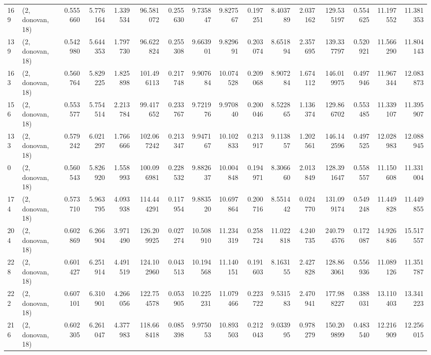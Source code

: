 \begin{tabular}{llrrrrrrrrrrrrrr}
169 &  (2, donovan, 18) &   0.555660 &   5.776164 &   1.339534 &    96.581072 &   0.255630 &   9.735847 &   9.827567 &  0.197251 &   8.403789 &   2.037162 &   129.535197 &  0.554625 &  11.197552 &  11.381353 \\
139 &  (2, donovan, 18) &   0.542980 &   5.644353 &   1.797730 &    96.622824 &   0.255308 &   9.663901 &   9.829691 &  0.203074 &   8.651894 &   2.357695 &   139.337797 &  0.520921 &  11.566290 &  11.804143 \\
163 &  (2, donovan, 18) &   0.560764 &   5.829225 &   1.825898 &   101.496113 &   0.217748 &   9.907684 &  10.074528 &  0.209068 &   8.907284 &   1.674112 &   146.019975 &  0.497946 &  11.967344 &  12.083873 \\
156 &  (2, donovan, 18) &   0.553577 &   5.754514 &   2.213784 &    99.417652 &   0.233767 &   9.721976 &   9.970840 &  0.200046 &   8.522865 &   1.136374 &   129.866702 &  0.553485 &  11.339107 &  11.395907 \\
133 &  (2, donovan, 18) &   0.579242 &   6.021297 &   1.766666 &   102.067242 &   0.213347 &   9.947167 &  10.102833 &  0.213917 &   9.113857 &   1.202561 &   146.142596 &  0.497525 &  12.028983 &  12.088945 \\
0   &  (2, donovan, 18) &   0.560543 &   5.826920 &   1.558993 &   100.096981 &   0.228532 &   9.882637 &  10.004848 &  0.194971 &   8.306660 &   2.013849 &   128.391647 &  0.558557 &  11.150608 &  11.331004 \\
174 &  (2, donovan, 18) &   0.573710 &   5.963795 &   4.093938 &   114.444291 &   0.117954 &   9.883520 &  10.697864 &  0.200716 &   8.551442 &   0.024770 &   131.099174 &  0.549248 &  11.449828 &  11.449855 \\
204 &  (2, donovan, 18) &   0.602869 &   6.266904 &   3.971490 &   126.209925 &   0.027274 &  10.508910 &  11.234319 &  0.258724 &  11.022818 &   4.240735 &   240.794576 &  0.172087 &  14.926846 &  15.517557 \\
228 &  (2, donovan, 18) &   0.601427 &   6.251914 &   4.491519 &   124.102960 &   0.043513 &  10.194568 &  11.140151 &  0.191603 &   8.163155 &   2.427828 &   128.863061 &  0.556936 &  11.089126 &  11.351787 \\
222 &  (2, donovan, 18) &   0.607101 &   6.310901 &   4.266056 &   122.754578 &   0.053905 &  10.225231 &  11.079466 &  0.223722 &   9.531583 &   2.470941 &   177.988227 &  0.388031 &  13.110403 &  13.341223 \\
216 &  (2, donovan, 18) &   0.602305 &   6.261047 &   4.377983 &   118.668418 &   0.085398 &   9.975053 &  10.893503 &  0.212043 &   9.033995 &   0.978279 &   150.209899 &  0.483540 &  12.216909 &  12.256015 \\

\end{tabular}

